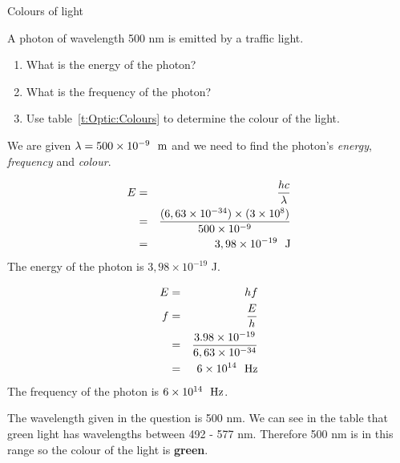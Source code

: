 \begin{wex}{Colours of light}
{A photon of wavelength 500 nm is emitted by a traffic light. 
\begin{enumerate}
\item What is the energy of the photon?
\item What is the frequency of the photon?
\item Use table~\ref{t:Optic:Colours} to determine the colour of the light.
\end{enumerate}
}
{
We are given $\lambda = 500 \times 10^{-9}~~\rm{m}$ and we need to find the photon's \textit{energy}, \textit{frequency} and \textit{colour}.

\begin{eqnarray*}
E & = & \frac{hc}{\lambda} \\
& = & \frac{(6,63 \times 10^{-34}) \times (3 \times 10^{8})}{ 500 \times 10^{-9}} \\
& = & 3,98 \times 10^{-19}~~\rm{J}
\end{eqnarray*}
The energy of the photon is $3,98\times10^{-19}$ J.

\begin{eqnarray*}
E & = & hf \\
f & = & \frac{E}{h} \\
  & = & \frac{3.98 \times 10^{-19}}{6,63 \times 10^{-34}}\\
  & = & 6 \times 10^{14}~~\rm{Hz}
\end{eqnarray*}
The frequency of the photon is $6 \times 10^{14}~~\rm{Hz}$.

The wavelength given in the question is 500 nm. We can see in the table that green light has wavelengths between 492 - 577 nm. Therefore 500 nm is in this range so the colour of the light is \textbf{green}.

}
\end{wex}

